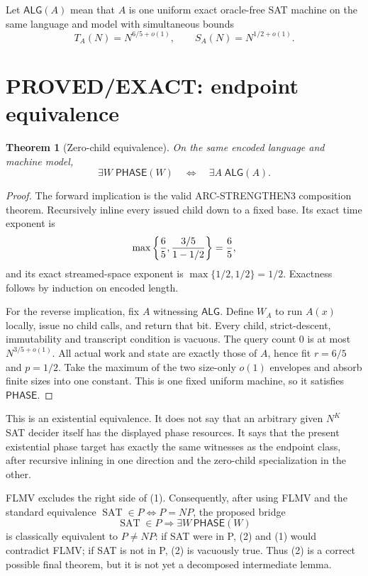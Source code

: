 \documentclass[11pt]{article}
\newtheorem{theorem}{Theorem}
\newcommand{\SAT}{\operatorname{SAT}}
\newcommand{\PHASE}{\mathsf{PHASE}}
\newcommand{\ALG}{\mathsf{ALG}}
\begin{document}
Let $\ALG(A)$ mean that $A$ is one uniform exact oracle-free SAT machine on
the same language and model with simultaneous bounds
\[
 T_A(N)=N^{6/5+o(1)},\qquad S_A(N)=N^{1/2+o(1)}.
\]

\section{PROVED/EXACT: endpoint equivalence}

\begin{theorem}[Zero-child equivalence]
On the same encoded language and machine model,
\[
 \boxed{\exists W\;\PHASE(W)
 \quad\Longleftrightarrow\quad
 \exists A\;\ALG(A).}
 \tag{1}
\]
\end{theorem}

\begin{proof}
The forward implication is the valid ARC-STRENGTHEN3 composition theorem.
Recursively inline every issued child down to a fixed base.  Its exact
time exponent is
\[
 \max\left\{\frac65,
 {3/5\over1-1/2}\right\}=\frac65,
\]
and its exact streamed-space exponent is
$\max\{1/2,1/2\}=1/2$.  Exactness follows by induction on encoded length.

For the reverse implication, fix $A$ witnessing $\ALG$.  Define $W_A$ to run
$A(x)$ locally, issue no child calls, and return that bit.  Every child,
strict-descent, immutability and transcript condition is vacuous.  The query
count $0$ is at most $N^{3/5+o(1)}$.  All actual work and state are exactly
those of $A$, hence fit $r=6/5$ and $p=1/2$.  Take the maximum of the two
size-only $o(1)$ envelopes and absorb finite sizes into one constant.  This
is one fixed uniform machine, so it satisfies $\PHASE$.
\end{proof}

This is an existential equivalence.  It does not say that an arbitrary given
$N^K$ SAT decider itself has the displayed phase resources.  It says that
the present existential phase target has exactly the same witnesses as the
endpoint class, after recursive inlining in one direction and the zero-child
specialization in the other.

FLMV excludes the right side of (1).  Consequently, after using FLMV and
the standard equivalence $\SAT\in P\Longleftrightarrow P=NP$, the proposed
bridge
\[
 \SAT\in P\Longrightarrow\exists W\,\PHASE(W)
 \tag{2}
\]
is classically equivalent to $P\ne NP$: if SAT were in P, (2) and (1) would
contradict FLMV; if SAT is not in P, (2) is vacuously true.  Thus (2) is a
correct possible final theorem, but it is not yet a decomposed intermediate
lemma.
\end{document}
